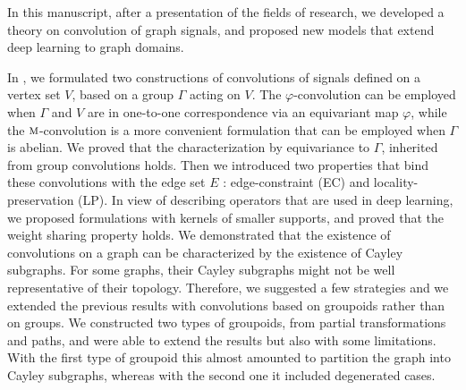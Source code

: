 In this manuscript, after a presentation of the fields of research, we developed a theory on convolution of graph signals, and proposed new models that extend deep learning to graph domains.

\vspace{0.2cm}

In , we formulated two constructions of convolutions of signals defined on a vertex set $V$, based on a group $\Gamma$ acting on $V$. The $\varphi$-convolution can be employed when $\Gamma$ and $V$ are in one-to-one correspondence via an equivariant map $\varphi$, while the $\operatorname{\textsc{m}}$-convolution is a more convenient formulation that can be employed when $\Gamma$ is abelian. We proved that the characterization by equivariance to $\Gamma$, inherited from group convolutions holds. Then we introduced two properties that bind these convolutions with the edge set $E$ : edge-constraint (EC) and locality-preservation (LP). In view of describing operators that are used in deep learning, we proposed formulations with kernels of smaller supports, and proved that the weight sharing property holds. We demonstrated that the existence of convolutions on a graph can be characterized by the existence of Cayley subgraphs. For some graphs, their Cayley subgraphs might not be well representative of their topology. Therefore, we suggested a few strategies and we extended the previous results with convolutions based on groupoids rather than on groups. We constructed two types of groupoids, from partial transformations and paths, and were able to extend the results but also with some limitations. With the first type of groupoid this almost amounted to partition the graph into Cayley subgraphs, whereas with the second one it included degenerated cases.

\vspace{0.2cm}

